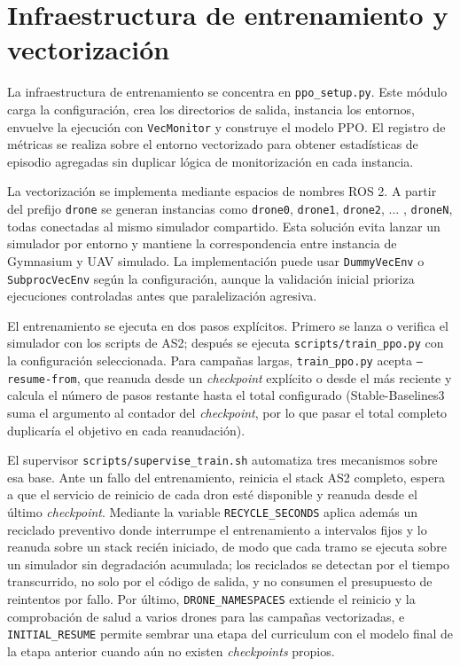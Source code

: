 \section{Infraestructura de entrenamiento y vectorización} \label{sct:implementacion:infraestructura_entrenamiento}

La infraestructura de entrenamiento se concentra en \texttt{ppo\_setup.py}. Este
módulo carga la configuración, crea los directorios de salida, instancia los
entornos, envuelve la ejecución con \texttt{VecMonitor} y construye el modelo PPO.
El registro de métricas se realiza sobre el entorno vectorizado para obtener
estadísticas de episodio agregadas sin duplicar lógica de monitorización en cada
instancia.

La vectorización se implementa mediante espacios de nombres ROS 2. A partir del
prefijo \texttt{drone} se generan instancias como \texttt{drone0},
\texttt{drone1}, \texttt{drone2}, ... , \texttt{droneN}, todas conectadas al mismo
simulador compartido. Esta solución evita lanzar un simulador por entorno y
mantiene la correspondencia entre instancia de Gymnasium y UAV simulado. La
implementación puede usar \texttt{DummyVecEnv} o \texttt{SubprocVecEnv} según la
configuración, aunque la validación inicial prioriza ejecuciones controladas
antes que paralelización agresiva.

El entrenamiento se ejecuta en dos pasos explícitos. Primero se lanza o verifica
el simulador con los scripts de AS2; después se ejecuta
\texttt{scripts/train\_ppo.py} con la configuración seleccionada. Para campañas
largas, \texttt{train\_ppo.py} acepta \texttt{--resume-from}, que reanuda desde
un \emph{checkpoint} explícito o desde el más reciente y calcula el número de
pasos restante hasta el total configurado (Stable-Baselines3 suma el argumento al
contador del \emph{checkpoint}, por lo que pasar el total completo duplicaría el
objetivo en cada reanudación).

El supervisor \texttt{scripts/supervise\_train.sh} automatiza tres mecanismos
sobre esa base. Ante un fallo del entrenamiento, reinicia el stack AS2 completo,
espera a que el servicio de reinicio de cada dron esté disponible y reanuda desde
el último \emph{checkpoint}. Mediante la variable \texttt{RECYCLE\_SECONDS}
aplica además un reciclado preventivo donde interrumpe el entrenamiento a intervalos
fijos y lo reanuda sobre un stack recién iniciado, de modo que cada tramo se
ejecuta sobre un simulador sin degradación acumulada; los reciclados se detectan
por el tiempo transcurrido, no solo por el código de salida, y no consumen el
presupuesto de reintentos por fallo. Por último, \texttt{DRONE\_NAMESPACES}
extiende el reinicio y la comprobación de salud a varios drones para las campañas
vectorizadas, e \texttt{INITIAL\_RESUME} permite sembrar una etapa del curriculum
con el modelo final de la etapa anterior cuando aún no existen \emph{checkpoints}
propios.

